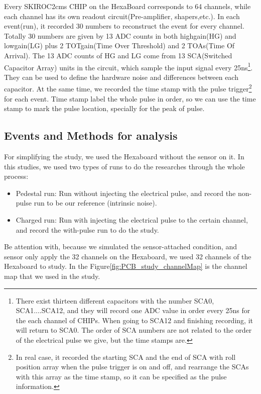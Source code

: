 Every SKIROC2cms CHIP on the HexaBoard corresponds to 64 channels, while each channel has its own readout circuit(Pre-amplifier, shapers,etc.). In each event(run), it recorded 30 numbers to reconstruct the event for every channel. Totally 30 numbers are given by 13 ADC counts in both highgain(HG) and lowgain(LG) plus 2 TOTgain(Time Over Threshold) and 2 TOAs(Time Of Arrival).  The 13 ADC counts of HG and LG come from 13 SCA(Switched Capacitor Array) units in the circuit, which sample the input signal every 25ns\footnote{There exist thirteen different capacitors with the number SCA0, SCA1....SCA12, and they will record one ADC value in order every 25ns for the each channel of CHIPs. When going to SCA12 and finishing recording, it will return to SCA0. The order of SCA numbers are not related to the order of the electrical pulse we give, but the time stamps are.}. They can be used to define the hardware noise and differences between each capacitor. At the same time, we recorded the time stamp with the pulse trigger\footnote{In real case, it recorded the starting SCA and the end of SCA with roll position array when the pulse trigger is on and off, and rearrange the SCAs with this array as the time stamp, so it can be specified as the pulse information.} for each event. Time stamp label the whole pulse in order,  so we can use the time stamp to mark the pulse location, specially for the peak of pulse. 

\subsection{Events and Methods for analysis}

For simplifying the study, we used the Hexaboard without the sensor on it. In this studies, we used two types of runs to do the researches through the whole process:
\begin{itemize}
\item Pedestal run: Run without injecting the electrical pulse, and record the non-pulse run to be our reference (intrinsic noise).
\item Charged run: Run with injecting the electrical pulse to the certain channel, and record the with-pulse run to do the study. 
\end{itemize}

Be attention with, because we simulated the sensor-attached condition, and sensor only apply the 32 channels on the Hexaboard, we used 32 channels of the Hexaboard to study. In the Figure\ref{fig:PCB_study_channelMap} is the channel map that we used in the study.

